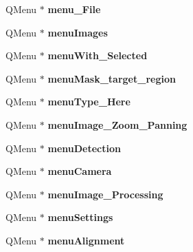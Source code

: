 \begin{DoxyCompactItemize}
Q\+Menu $\ast$ {\bfseries menu\+\_\+\+File}
\item 
\mbox{\label{class_ui___main_window_ab172f93f22b4567b040d62d5372e9e90}} 
Q\+Menu $\ast$ {\bfseries menu\+Images}
\item 
\mbox{\label{class_ui___main_window_a99419bf330964ed9f5c5c6d02ef8d924}} 
Q\+Menu $\ast$ {\bfseries menu\+With\+\_\+\+Selected}
\item 
\mbox{\label{class_ui___main_window_aec690ade184c1eb6056af99d39a1714a}} 
Q\+Menu $\ast$ {\bfseries menu\+Mask\+\_\+target\+\_\+region}
\item 
\mbox{\label{class_ui___main_window_a1240045c3b078590becae3c51418a3f7}} 
Q\+Menu $\ast$ {\bfseries menu\+Type\+\_\+\+Here}
\item 
\mbox{\label{class_ui___main_window_a939c943a64b6ee56dff201caa11eaeeb}} 
Q\+Menu $\ast$ {\bfseries menu\+Image\+\_\+\+Zoom\+\_\+\+Panning}
\item 
\mbox{\label{class_ui___main_window_a067ad38c8fbc65bc4cf62c50a3c13c25}} 
Q\+Menu $\ast$ {\bfseries menu\+Detection}
\item 
\mbox{\label{class_ui___main_window_aee81092157c2175414c3f118907c3824}} 
Q\+Menu $\ast$ {\bfseries menu\+Camera}
\item 
\mbox{\label{class_ui___main_window_ac92066abe04d62efe54550b886395198}} 
Q\+Menu $\ast$ {\bfseries menu\+Image\+\_\+\+Processing}
\item 
\mbox{\label{class_ui___main_window_a19ede563c6a2fa1690ffa5abe29eb362}} 
Q\+Menu $\ast$ {\bfseries menu\+Settings}
\item 
\mbox{\label{class_ui___main_window_a6de383fea17a7bf05a9e177b6cd76824}} 
Q\+Menu $\ast$ {\bfseries menu\+Alignment}
\item 
\mbox{\label{class_ui___main_window_a5172877001c8c7b4e0f6de50421867d1}} 

\end{DoxyCompactItemize}
